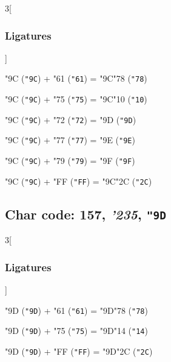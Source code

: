 \documentclass{article}
\newlength{\maxcharwidth}
\begin{document}
\begin{multicols}{3}[\subsubsection{Ligatures}]

{\testfont\char"9C\noboundary} ({\tt"9C}) + {\testfont\char"61\noboundary} ({\tt"61}) = {\testfont\char"9C\noboundary}{\testfont\char"78\noboundary} ({\tt"78}) 

{\testfont\char"9C\noboundary} ({\tt"9C}) + {\testfont\char"75\noboundary} ({\tt"75}) = {\testfont\char"9C\noboundary}{\testfont\char"10\noboundary} ({\tt"10}) 

{\testfont\char"9C\noboundary} ({\tt"9C}) + {\testfont\char"72\noboundary} ({\tt"72}) = {\testfont\char"9D\noboundary} ({\tt"9D}) 

{\testfont\char"9C\noboundary} ({\tt"9C}) + {\testfont\char"77\noboundary} ({\tt"77}) = {\testfont\char"9E\noboundary} ({\tt"9E}) 

{\testfont\char"9C\noboundary} ({\tt"9C}) + {\testfont\char"79\noboundary} ({\tt"79}) = {\testfont\char"9F\noboundary} ({\tt"9F}) 

{\testfont\char"9C\noboundary} ({\tt"9C}) + {\testfont\char"FF\noboundary} ({\tt"FF}) = {\testfont\char"9C\noboundary}{\testfont\char"2C\noboundary} ({\tt"2C}) 

\end{multicols}

\subsection{Char code: 157, {\it'235}, {\tt"9D}}
\label{char_157}


\begin{multicols}{3}[\subsubsection{Ligatures}]

{\testfont\char"9D\noboundary} ({\tt"9D}) + {\testfont\char"61\noboundary} ({\tt"61}) = {\testfont\char"9D\noboundary}{\testfont\char"78\noboundary} ({\tt"78}) 

{\testfont\char"9D\noboundary} ({\tt"9D}) + {\testfont\char"75\noboundary} ({\tt"75}) = {\testfont\char"9D\noboundary}{\testfont\char"14\noboundary} ({\tt"14}) 

{\testfont\char"9D\noboundary} ({\tt"9D}) + {\testfont\char"FF\noboundary} ({\tt"FF}) = {\testfont\char"9D\noboundary}{\testfont\char"2C\noboundary} ({\tt"2C}) 

\end{multicols}
\end{document}

